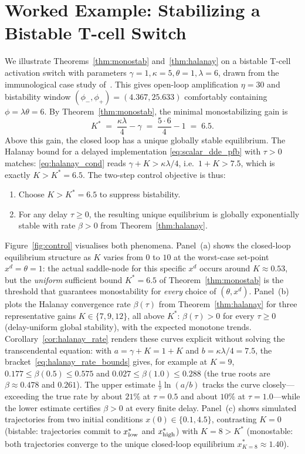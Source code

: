 \documentclass[12pt]{article}
\begin{document}
\section{Worked Example: Stabilizing a Bistable T-cell Switch}
\label{sec:control_example}

We illustrate Theorems~\ref{thm:monostab} and~\ref{thm:halanay} on
a bistable T-cell activation switch with parameters
$\gamma=1,\kappa=5,\theta=1,\lambda=6$, drawn from the immunological
case study of~\cite{belgacem2026extensions}. This gives open-loop
amplification $\eta=30$ and bistability window
$(\phi_{-},\phi_{+})=(4.367,25.633)$ comfortably containing
$\phi=\lambda\theta=6$. By Theorem~\ref{thm:monostab}, the minimal
monostabilizing gain is
\[
K^{*} \;=\; \frac{\kappa\lambda}{4}-\gamma
       \;=\; \frac{5\cdot 6}{4}-1 \;=\; 6.5.
\]
Above this gain, the closed loop has a unique globally stable
equilibrium. The Halanay bound for a delayed implementation
\eqref{eq:scalar_dde_pfb} with $\tau>0$ matches:
\eqref{eq:halanay_cond} reads $\gamma+K>\kappa\lambda/4$,
i.e.\ $1+K>7.5$, which is exactly $K>K^{*}=6.5$. The two-step
control objective is thus:
\begin{enumerate}
\item Choose $K> K^{*}=6.5$ to suppress bistability.
\item For any delay $\tau\ge 0$, the resulting unique equilibrium is
      globally exponentially stable with rate $\beta>0$ from
      Theorem~\ref{thm:halanay}.
\end{enumerate}
Figure~\ref{fig:control} visualises both phenomena. Panel~(a) shows
the closed-loop equilibrium structure as $K$ varies from $0$ to
$10$ at the worst-case set-point $x^{d}=\theta=1$: the actual
saddle-node for this specific $x^{d}$ occurs around $K\approx 0.53$,
but the \emph{uniform} sufficient bound $K^{*}=6.5$ of
Theorem~\ref{thm:monostab} is the threshold that guarantees
monostability for \emph{every} choice of $(\theta,x^{d})$.
Panel~(b) plots the Halanay convergence rate $\beta(\tau)$ from
Theorem~\ref{thm:halanay} for three representative gains
$K\in\{7,9,12\}$, all above $K^{*}$: $\beta(\tau)>0$ for every
$\tau\ge 0$ (delay-uniform global stability), with the expected
monotone trends. Corollary~\ref{cor:halanay_rate} renders these
curves explicit without solving the transcendental equation: with
$a=\gamma+K=1+K$ and $b=\kappa\lambda/4=7.5$, the
bracket~\eqref{eq:halanay_rate_bounds} gives, for example at $K=9$,
$0.177\le\beta(0.5)\le0.575$ and $0.027\le\beta(1.0)\le0.288$ (the
true roots are $\beta\approx0.478$ and $0.261$). The upper estimate
$\tfrac1\tau\ln(a/b)$ tracks the curve closely---exceeding the true
rate by about $21\%$ at $\tau=0.5$ and about $10\%$ at $\tau=1.0$---while
the lower estimate certifies $\beta>0$ at every finite delay. Panel~(c) shows simulated
trajectories from two
initial conditions $x(0)\in\{0.1,4.5\}$, contrasting $K=0$
(bistable: trajectories commit to $x_{\rm low}^{*}$ and
$x_{\rm high}^{*}$) with $K=8>K^{*}$ (monostable: both trajectories
converge to the unique closed-loop equilibrium
$x^{*}_{K=8}\approx 1.40$).
\end{document}
